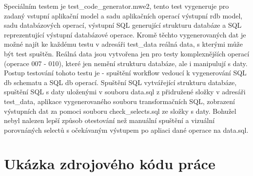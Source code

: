 \documentclass[11pt,twoside,a4paper]{book}
\begin{document}
Speciálním testem je test\_code\_generator.mwe2, tento test vygeneruje pro
zadaný vstupní aplikační model a sadu aplikačních operací výstupní rdb model, sadu
databázových operací, výstupní SQL generující strukturu databáze a SQL
reprezentující výstupní databázové operace. Kromě těchto vygenerovaných dat je
možné najít ke každému testu v adresáři test\_data reálná data, s kterými může
být test spuštěn. Reálná data jsou vytvořena jen pro testy komplexnějších
operací (operace 007 - 010), které jen nemění strukturu databáze, ale i
manipulují s daty. Postup testování tohoto testu je - spuštění workflow vedoucí k
vygenerování SQL db schematu a SQL db operací. Spuštění SQL vytvářející
strukturu databáze, spuštění SQL s daty uloženými v souboru data.sql z
přidružené složky v adresáři test\_data, aplikace vygenerovaného souboru
transformačních SQL, zobrazení výstupních dat za pomoci souboru
check\_selects.sql ze složky s daty. Bohužel nebyl nalezen lepší způsob
otestování než manuální spuštění a vizuální porovnáných selectů s očekávaným
výstupem po apliaci dané operace na data.sql.

\chapter{Ukázka zdrojového kódu práce}
\end{document}
